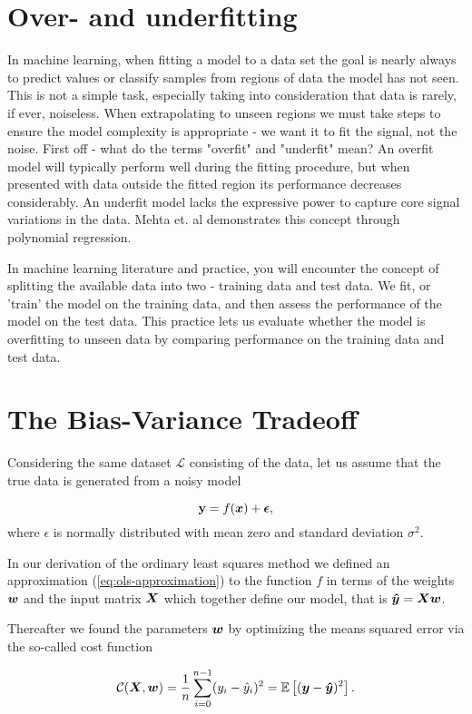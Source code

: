 \section{Over- and underfitting}\label{sec:overfitting}
In machine learning, when fitting a model to a data set the goal is nearly always to predict 
values or classify samples from regions of data the model has not seen. This is not a simple task,
especially taking into consideration that data is rarely, if ever, noiseless. When extrapolating to 
unseen regions we must take steps to ensure the model complexity is appropriate - we want it to fit 
the signal, not the noise. First off - what do the terms "overfit" and "underfit" mean?
An overfit model will typically perform well during the fitting procedure, but when presented with
data outside the fitted region its performance decreases considerably.
An underfit model lacks the expressive power to capture core signal variations in the data.
Mehta et. al \cite{Mehta2019} demonstrates this concept through polynomial regression.

In machine learning literature and practice, you will encounter the concept of
splitting the available data into two - training data and test data. We fit, or 'train'
the model on the training data, and then assess the performance of the model on the 
test data. This practice lets us evaluate whether the model is overfitting to unseen
data by comparing performance on the training data and test data.

\section{The Bias-Variance Tradeoff}\label{sec:bias-variance}
Considering the same dataset $\mathcal{L}$ consisting of the data,
let us assume that the true data is generated from a noisy model

$$\mathbf{y}=f({\boldsymbol{x}}) + {\boldsymbol{\epsilon}},$$
where $\epsilon$ is normally distributed with mean zero and standard deviation $\sigma^2$.

In our derivation of the ordinary least squares method we defined
an approximation (\ref{eq:ols-approximation}) to the function $f$ in terms of the 
weights ${\boldsymbol{w}}$ and the input matrix ${\boldsymbol{X}}$ which together define our model,
that is ${\boldsymbol{\hat{y}}}={\boldsymbol{X}}{\boldsymbol{w}}$. 

Thereafter we found the parameters ${\boldsymbol{w}}$ by optimizing the means squared error via the so-called cost function

$$\mathcal{C}({\boldsymbol{X}},{\boldsymbol{w}}) =\frac{1}{n}\sum_{i=0}^{n-1}(y_i-\hat{y}_i)^2=\mathbb{E}\left[({\boldsymbol{y}}-{\boldsymbol{\hat{y}}})^2\right].$$

